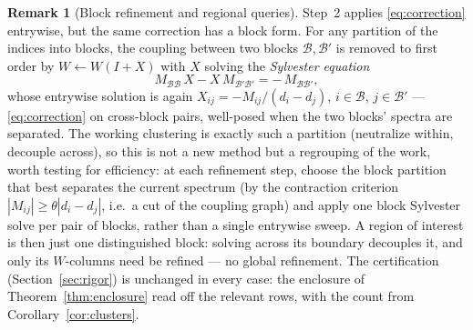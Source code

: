 \documentclass[11pt,a4paper]{article}
\newcommand{\abs}[1]{\left|#1\right|}
\theoremstyle{plain}
\theoremstyle{definition}
\newtheorem{remark}[theorem]{Remark}
\begin{document}
\begin{remark}[Block refinement and regional queries]\label{rem:block}
Step~2 applies \eqref{eq:correction} entrywise, but the same correction has a block
form. For any partition of the indices into blocks, the coupling between two blocks
$\mathcal B,\mathcal B'$ is removed to first order by $W\leftarrow W(I+X)$ with $X$
solving the \emph{Sylvester equation}
\[
  M_{\mathcal B\mathcal B}\,X - X\,M_{\mathcal B'\mathcal B'} = -\,M_{\mathcal B\mathcal B'},
\]
whose entrywise solution is again $X_{ij}=-M_{ij}/(d_i-d_j)$, $i\in\mathcal B$,
$j\in\mathcal B'$ --- \eqref{eq:correction} on cross-block pairs, well-posed when the
two blocks' spectra are separated. The working clustering is exactly such a partition
(neutralize within, decouple across), so this is not a new method but a regrouping of
the work, worth testing for efficiency: at each refinement step, choose the block
partition that best separates the current spectrum (by the contraction criterion
$\abs{M_{ij}}\ge\theta\abs{d_i-d_j}$, i.e.\ a cut of the coupling graph) and apply one
block Sylvester solve per pair of blocks, rather than a single entrywise sweep. A
region of interest is then just one distinguished block: solving across its boundary
decouples it, and only its $W$-columns need be refined --- no global refinement. The
certification (Section~\ref{sec:rigor}) is unchanged in every case: the enclosure of
Theorem~\ref{thm:enclosure} read off the relevant rows, with the count from
Corollary~\ref{cor:clusters}.
\end{remark}
\end{document}
